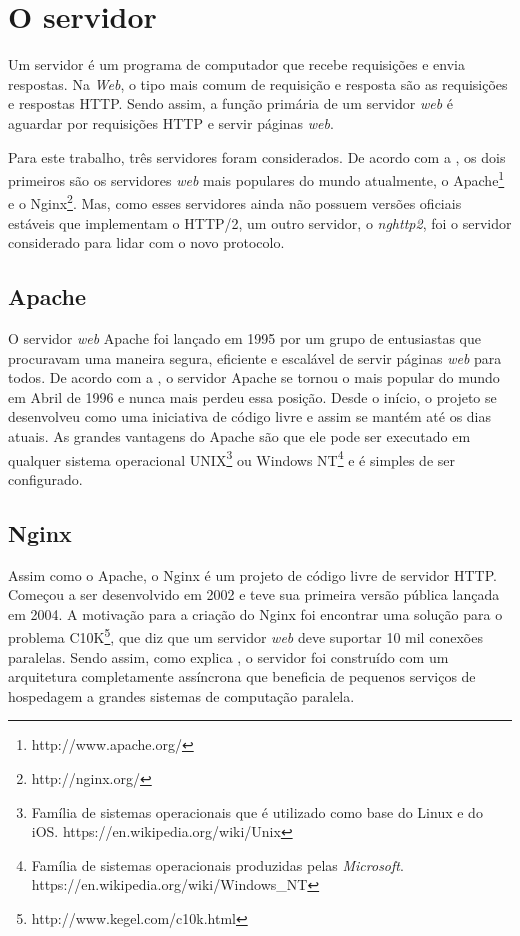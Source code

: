 \section{O servidor}
\label{oservidor}

Um servidor é um programa de computador que recebe requisições e envia respostas. Na \textit{Web}, o tipo mais comum de requisição e resposta são as requisições e respostas HTTP. Sendo assim, a função primária de um servidor \textit{web} é aguardar por requisições HTTP e servir páginas \textit{web}.

Para este trabalho, três servidores foram considerados. De acordo com a , os dois primeiros são os servidores \textit{web} mais populares do mundo atualmente, o Apache\footnote{http://www.apache.org/} e o Nginx\footnote{http://nginx.org/}. Mas, como esses servidores ainda não possuem versões oficiais estáveis que implementam o HTTP/2, um outro servidor, o \textit{nghttp2}, foi o servidor considerado para lidar com o novo protocolo.

\subsection{Apache}
\label{apache}

O servidor \textit{web} Apache foi lançado em 1995 por um grupo de entusiastas que procuravam uma maneira segura, eficiente e escalável de servir páginas \textit{web} para todos.  De acordo com a , o servidor Apache se tornou o mais popular do mundo em Abril de 1996 e nunca mais perdeu essa posição. Desde o início, o projeto se desenvolveu como uma iniciativa de código livre e assim se mantém até os dias atuais. As grandes vantagens do Apache são que ele pode ser executado em qualquer sistema operacional UNIX\footnote{Família de sistemas operacionais que é utilizado como base do Linux e do iOS. https://en.wikipedia.org/wiki/Unix} ou Windows NT\footnote{Família de sistemas operacionais produzidas pelas \textit{Microsoft}. https://en.wikipedia.org/wiki/Windows\_NT} e é simples de ser configurado.

\subsection{Nginx}
\label{nginx}

Assim como o Apache, o Nginx é um projeto de código livre de servidor HTTP. Começou a ser desenvolvido em 2002 e teve sua primeira versão pública lançada em 2004. A motivação para a criação do Nginx foi encontrar uma solução para o problema C10K\footnote{http://www.kegel.com/c10k.html}, que diz que um servidor \textit{web} deve suportar 10 mil conexões paralelas. Sendo assim, como explica , o servidor foi construído com um arquitetura completamente assíncrona que beneficia de pequenos serviços de hospedagem a grandes sistemas de computação paralela.

